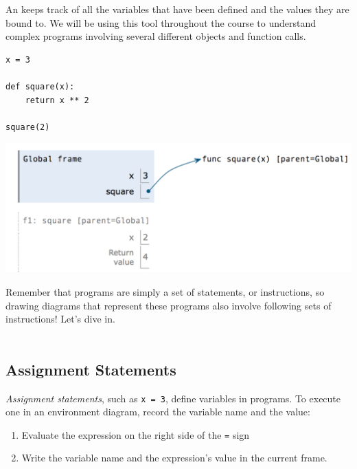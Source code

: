 An  keeps track of all the variables that have been
defined and the values they are bound to. We will be using this tool throughout
the course to understand complex programs involving several different objects
and function calls.

\begin{minipage}{0.3\linewidth}
\begin{lstlisting}[linewidth=\linewidth]
x = 3

def square(x):
    return x ** 2

square(2)
\end{lstlisting}
\end{minipage}%
\begin{minipage}{0.7\linewidth}
\includegraphics[width=\linewidth]{simpler_hof.png}
\end{minipage}

Remember that programs are simply a set of statements, or instructions, so
drawing diagrams that represent these programs also involve following sets
of instructions! Let's dive in. \\\\

\subsection*{Assignment Statements}
\emph{Assignment statements}, such as \texttt{x = 3}, define variables in
programs. To execute one in an environment diagram, record the variable name
and the value:

\begin{enumerate}
    \item Evaluate the expression on the right side of the \texttt{=} sign
    \item Write the variable name and the expression's value in the current
    frame. \\
\end{enumerate}

